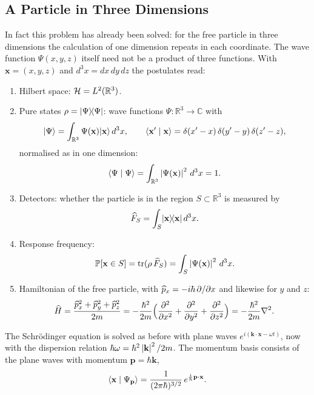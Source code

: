 \subsection{A Particle in Three Dimensions}
In fact this problem has already been solved: for the free particle in three dimensions the calculation of one dimension repeats in each coordinate. The wave function $\Psi(x,y,z)$ itself need not be a product of three functions. With $\mathbf{x} = (x,y,z)$ and $d^3x = dx\,dy\,dz$ the postulates read:
\begin{enumerate}
	\item Hilbert space: $\mathcal{H} = L^2(\mathbb{R}^3)$.
	\item Pure states $\rho = \lvert \Psi \rangle\!\langle \Psi \rvert$: wave functions $\Psi:\mathbb{R}^3\to\mathbb{C}$ with
	\begin{equation}
		\lvert \Psi \rangle = \int_{\mathbb{R}^3} \Psi(\mathbf{x})\lvert \mathbf{x} \rangle\,d^3x, \qquad \langle \mathbf{x}' \mid \mathbf{x} \rangle = \delta(x'-x)\,\delta(y'-y)\,\delta(z'-z),
	\end{equation}
	normalised as in one dimension:
	\begin{equation}
		\langle \Psi \mid \Psi \rangle = \int_{\mathbb{R}^3} \left\lvert \Psi(\mathbf{x}) \right\rvert^2\,d^3x = 1.
	\end{equation}
	\item Detectors: whether the particle is in the region $S\subset\mathbb{R}^3$ is measured by
	\begin{equation}
		\widehat{F}_S = \int_S \lvert \mathbf{x} \rangle\!\langle \mathbf{x} \rvert\,d^3x.
	\end{equation}
	\item Response frequency:
	\begin{equation}
		\mathbb{P}[\mathbf{x}\in S] = \operatorname{tr}(\rho\,\widehat{F}_S) = \int_S \left\lvert \Psi(\mathbf{x}) \right\rvert^2\,d^3x.
	\end{equation}
	\item Hamiltonian of the free particle, with $\widehat{p}_x = -i\hbar\,\partial/\partial x$ and likewise for $y$ and $z$:
	\begin{equation}
		\widehat{H} = \frac{\widehat{p}_x^2 + \widehat{p}_y^2 + \widehat{p}_z^2}{2m} = -\frac{\hbar^2}{2m}\Bigl(\frac{\partial^2}{\partial x^2} + \frac{\partial^2}{\partial y^2} + \frac{\partial^2}{\partial z^2}\Bigr) = -\frac{\hbar^2}{2m}\nabla^2.
	\end{equation}
\end{enumerate}
The Schrödinger equation is solved as before with plane waves $e^{i(\mathbf{k}\cdot\mathbf{x}-\omega t)}$, now with the dispersion relation $\hbar\omega = \hbar^2\left\lvert \mathbf{k} \right\rvert^2/2m$. The momentum basis consists of the plane waves with momentum $\mathbf{p} = \hbar\mathbf{k}$,
\begin{equation}
	\langle \mathbf{x} \mid \Psi_{\mathbf{p}} \rangle = \frac{1}{(2\pi\hbar)^{3/2}}\,e^{\frac{i}{\hbar}\mathbf{p}\cdot\mathbf{x}}.
\end{equation}


